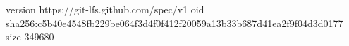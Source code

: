 version https://git-lfs.github.com/spec/v1
oid sha256:c5b40e4548fb229be064f3d4f0f412f20059a13b33b687d41ea2f9f04d3d0177
size 349680
